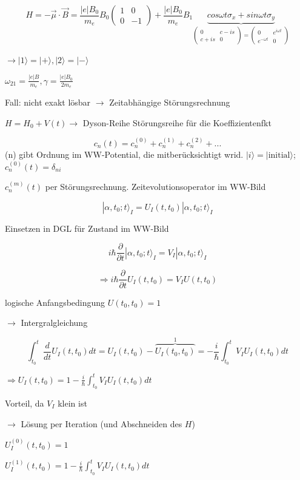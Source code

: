 \[H=-\vec \mu\cdot\vec B = \frac{|e|B_0}{m_e}B_0\begin{pmatrix} 1&0\\0&-1 \end{pmatrix} +\frac{|e|B_0}{m_e}B_1\underbrace{cos\omega t \sigma_x+ sin\omega t \sigma_y}_{\begin{pmatrix}0&c-is\\c+is&0\end{pmatrix}=\begin{pmatrix}0&e^{i\omega t}\\e^{-\omega t}&0\end{pmatrix}}\]

\(\rightarrow |1\rangle = |+\rangle,|2\rangle=|-\rangle\)

\(\omega_{21} = \frac{|e|B}{m_e},\gamma = \frac{|e|B_0}{2m_e}\)

Fall: nicht exakt lösbar \(\rightarrow\) Zeitabhängige Störungsrechnung

\(H= H_0+V(t)\rightarrow\) Dyson-Reihe Störungsreihe für die Koeffizientenfkt

\[ c_n(t) = c_n^{(0)} +c_n^{(1)} +c_n^{(2)} + ... \]
(n) gibt Ordnung im WW-Potential, die mitberücksichtigt wrid. \(|i\rangle = |\text{initial}\rangle\); \(c_n^{(0)}(t) = \delta_{ni}\)

\(c_n^{(m)}(t)\) per Störungsrechnung. Zeitevolutionsoperator im WW-Bild

\[ |\alpha,t_0;t\rangle_I = U_I(t,t_0)|\alpha,t_0;t\rangle_I\]

Einsetzen in DGL für Zustand im WW-Bild

\[ i\hbar \frac{\partial}{\partial t}|\alpha,t_0;t\rangle_I  = V_I|\alpha,t_0;t\rangle_I \]

\[\Rightarrow i\hbar  \frac{\partial}{\partial t}U_I(t,t_0) = V_IU(t,t_0)\]

logische Anfangsbedingung \(U(t_0,t_0)=1\)

\(\rightarrow\) Intergralgleichung

\[ \int_{t_0}^{t}\frac{d}{dt} U_I(t,t_0) dt = U_I(t,t_0) -\overbrace{U_I(t_0,t_0) }^{1} = -\frac{i}{\hbar}\int_{t_0}^{t}V_IU_I(t,t_0)dt\]

\(\Rightarrow U_I(t,t_0) = 1 - \frac{i}{\hbar} \int_{t_0}^{t}V_IU_I(t,t_0)dt\)

Vorteil, da \(V_I\) klein ist

\(\rightarrow\) Lösung per Iteration (und Abschneiden des \(H\))


\(U_I^{(0)}(t,t_0)=1\)

\(U_I^{(1)}(t,t_0)=1 - \frac{i}{\hbar} \int_{t_0}^{t}V_IU_I(t,t_0)dt\)

